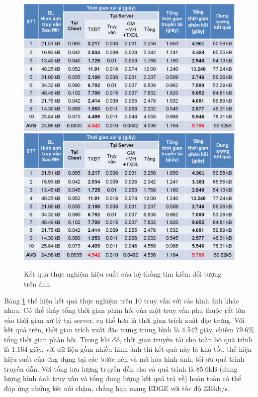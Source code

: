 \begin{figure}[!htbp]
  \begin{center}
    \leavevmode
    \ifpdf
      \includegraphics[scale=0.3]{app_experimental}
    \else
      \includegraphics[scale=0.3]{app_experimental}
    \fi
    \caption[Kết quả thực nghiệm hiệu suất của hệ thống tìm kiếm đối tượng trên ảnh.]{Kết quả thực nghiệm hiệu suất của hệ thống tìm kiếm đối tượng trên ảnh.}
    \label{FigAppExperimental}
  \end{center}
\end{figure}
		
	Bảng \ref{FigAppExperimental} thể hiện kết quả thực nghiệm trên 10 truy vấn với các hình ảnh khác nhau. Có thể thấy tổng thời gian phản hồi của một truy vấn phụ thuộc rất lớn vào thời gian xử lý tại server, cụ thể hơn là thời gian trích xuất đặc trưng. Với kết quả trên, thời gian trích xuất đặc trưng trung bình là 4.542 giây, chiếm 79.6\% tổng thời gian phản hồi. Trong khi đó, thời gian truyền tải cho toàn bộ quá trình là 1.164 giây, với dữ liệu gồm nhiều hình ảnh thì kết quả này là khá tốt, thể hiện hiệu suất của ứng dụng tại các bước nén và mã hóa hình ảnh, tối ưu quá trình truyền dẫn. Với tổng lưu lượng truyền dẫn cho cả quá trình là 85.6kB (dung lượng hình ảnh truy vấn và tổng dung lượng kết quả trả về) hoàn toàn có thể đáp ứng những kết nối chậm, chẳng hạn mạng EDGE với tốc độ 236kb/s.
	
